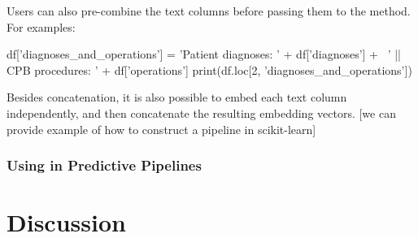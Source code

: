 \documentclass[article]{jss}
\begin{document}
Users can also pre-combine the text columns before passing them to the  method. For examples:
\begin{pyblock}
df['diagnoses_and_operations'] = 'Patient diagnoses: ' + df['diagnoses'] + \ 
  ' || CPB procedures: ' + df['operations']
print(df.loc[2, 'diagnoses_and_operations'])
\end{pyblock}
\stdoutpythontex %

Besides concatenation, it is also possible to embed each text column independently, and then concatenate the resulting embedding vectors. [we can provide example of how to construct a pipeline in scikit-learn]

\subsubsection[Using TabuLLM in Predictive Pipelines]{Using  in Predictive Pipelines}\label{subsubsec:using-predictive-pipelines}

\section[Discussion]{Discussion} \label{sec:discussion}


\end{document}
